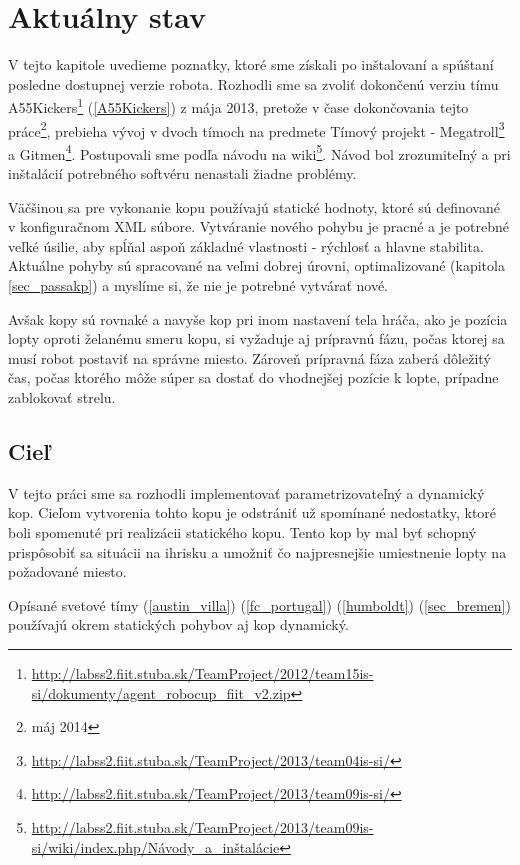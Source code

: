 \section{Aktuálny stav}

V tejto kapitole uvedieme poznatky, ktoré sme získali po inštalovaní a spúštaní posledne dostupnej verzie robota. Rozhodli sme sa zvoliť dokončenú verziu tímu A55Kickers\footnote{\url{http://labss2.fiit.stuba.sk/TeamProject/2012/team15is-si/dokumenty/agent_robocup_fiit_v2.zip}} (\ref{A55Kickers}) z mája 2013, pretože v čase dokončovania tejto práce\footnote{máj 2014}, prebieha vývoj v dvoch tímoch na predmete Tímový projekt - Megatroll\footnote{\url{http://labss2.fiit.stuba.sk/TeamProject/2013/team04is-si/}} a Gitmen\footnote{\url{http://labss2.fiit.stuba.sk/TeamProject/2013/team09is-si/}}. Postupovali sme podľa návodu na wiki\footnote{\url{http://labss2.fiit.stuba.sk/TeamProject/2013/team09is-si/wiki/index.php/Návody_a_inštalácie}}. Návod bol zrozumiteľný a pri inštalácií potrebného softvéru nenastali žiadne problémy.


Väčšinou sa pre vykonanie kopu používajú statické hodnoty, ktoré sú definované v konfiguračnom XML súbore. Vytváranie nového pohybu je pracné a je potrebné veľké úsilie, aby spĺňal aspoň základné vlastnosti - rýchlosť a hlavne stabilita. Aktuálne pohyby sú spracované na veľmi dobrej úrovni, optimalizované (kapitola \ref{sec_passakp}) a myslíme si, že nie je potrebné vytvárať nové.

Avšak kopy sú rovnaké a navyše kop pri inom nastavení tela hráča, ako je pozícia lopty oproti želanému smeru kopu, si vyžaduje aj prípravnú fázu, počas ktorej sa musí robot postaviť na správne miesto. Zároveň prípravná fáza zaberá dôležitý čas, počas ktorého môže súper sa dostať do vhodnejšej pozície k lopte, prípadne zablokovať strelu.

\subsection{Cieľ}

V tejto práci sme sa rozhodli implementovať parametrizovateľný a dynamický kop. Cieľom vytvorenia tohto kopu je odstrániť už spomínané nedostatky, ktoré boli spomenuté pri realizácii statického kopu. Tento kop by mal byť schopný prispôsobiť sa situácii na ihrisku a umožniť čo najpresnejšie umiestnenie lopty na požadované miesto.

Opísané svetové tímy (\ref{austin_villa}) (\ref{fc_portugal}) (\ref{humboldt}) (\ref{sec_bremen})  používajú okrem statických pohybov aj kop dynamický. 

